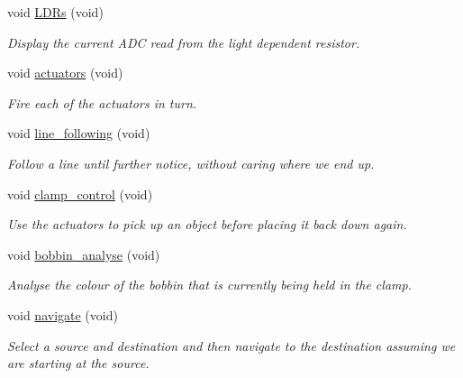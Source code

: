 \begin{DoxyCompactItemize}
void \hyperlink{classIDP_1_1SelfTests_a56952650637691f869ef21f7d43f1226}{LDRs} (void)
\begin{DoxyCompactList}\small\item\em Display the current ADC read from the light dependent resistor. \item\end{DoxyCompactList}\item 
void \hyperlink{classIDP_1_1SelfTests_a0ca765ac144fafaab502f4326a480486}{actuators} (void)
\begin{DoxyCompactList}\small\item\em Fire each of the actuators in turn. \item\end{DoxyCompactList}\item 
void \hyperlink{classIDP_1_1SelfTests_a0a1a40b56fee5249def567bebdb05dc1}{line\_\-following} (void)
\begin{DoxyCompactList}\small\item\em Follow a line until further notice, without caring where we end up. \item\end{DoxyCompactList}\item 
void \hyperlink{classIDP_1_1SelfTests_a896204355ca039660a12e8131578b6c3}{clamp\_\-control} (void)
\begin{DoxyCompactList}\small\item\em Use the actuators to pick up an object before placing it back down again. \item\end{DoxyCompactList}\item 
void \hyperlink{classIDP_1_1SelfTests_a66f0a3bad277e36b963b2bf3cd5df9dd}{bobbin\_\-analyse} (void)
\begin{DoxyCompactList}\small\item\em Analyse the colour of the bobbin that is currently being held in the clamp. \item\end{DoxyCompactList}\item 
void \hyperlink{classIDP_1_1SelfTests_a710347081427c05706f92bdd12f62fbe}{navigate} (void)
\begin{DoxyCompactList}\small\item\em Select a source and destination and then navigate to the destination assuming we are starting at the source. \item\end{DoxyCompactList}\item 

\end{DoxyCompactItemize}
